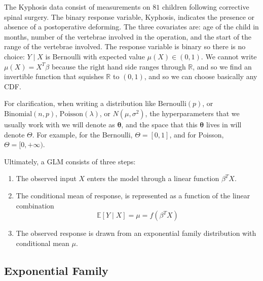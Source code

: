 \documentclass{article}
\begin{document}
  \begin{example}
    The Kyphosis data consist of measurements on $81$ children following corrective spinal surgery. The binary response variable, Kyphosis, indicates the presence or absence of a postoperative deforming. The three covariates are: age of the child in months, number of the vertebrae involved in the operation, and the start of the range of the vertebrae involved. The response variable is binary so there is no choice: $Y \mid X$ is Bernoulli with expected value $\mu(X) \in (0, 1)$. We cannot write $\mu(X) = X^T \beta$ because the right hand side ranges through $\mathbb{R}$, and so we find an invertible function that squishes $\mathbb{R}$ to $(0, 1)$, and so we can choose basically any CDF. 
  \end{example}

  For clarification, when writing a distribution like $\mathrm{Bernoulli}(p)$, or $\mathrm{Binomial}(n, p)$, $\mathrm{Poisson}(\lambda)$, or $N(\mu, \sigma^2)$, the hyperparameters that we usually work with we will denote as $\boldsymbol{\theta}$, and the space that this $\boldsymbol{\theta}$ lives in will denote $\Theta$. For example, for the Bernoulli, $\Theta = [0, 1]$, and for Poisson, $\Theta = [0, +\infty)$. 

  Ultimately, a GLM consists of three steps: 
  \begin{enumerate}
    \item The observed input $X$ enters the model through a linear function $\beta^T X$. 
    \item The conditional mean of response, is represented as a function of the linear combination 
      \begin{equation}
        \mathbb{E}[Y \mid X] = \mu = f(\beta^T X)
      \end{equation}
    \item The observed response is drawn from an exponential family distribution with conditional mean $\mu$. 
  \end{enumerate}

  \subsection{Exponential Family}
\end{document}
